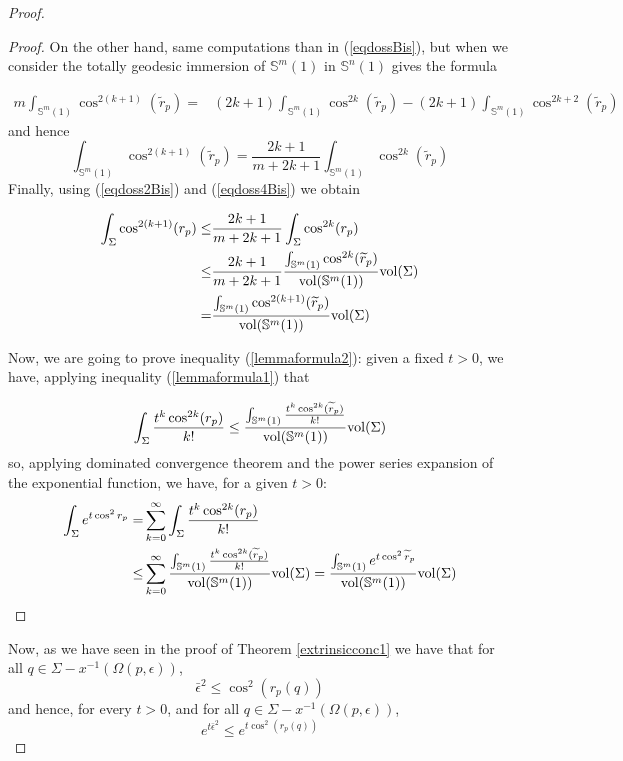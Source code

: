 \documentclass{amsart}
\theoremstyle{definition}
\theoremstyle{remark}
\newcommand{\ese}{\mathbb{S}}
\begin{document}
\begin{proof}
\begin{proof}
On the other hand, same computations than in (\ref{eqdossBis}), but when we consider the totally geodesic immersion of $\ese^m(1)$ in $\ese^n(1)$ gives the formula

$$
\begin{aligned}
m\int_{\ese^m(1)} \cos^{2(k+1)}(\widetilde{r}_p)=&(2k+1)\int_{\ese^m(1)}\cos^{2k}(\widetilde{r}_p)-(2k+1)\int_{\ese^m(1)} \cos^{2k+2}(\widetilde{r}_p)
\end{aligned}
$$
and hence
\begin{equation}\label{eqdoss4Bis}
\int_{\ese^m(1)} \cos^{2(k+1)}(\widetilde{r}_p)=\frac{2k+1}{m+2k+1}\int_{\ese^m(1)}\cos^{2k}(\widetilde{r}_p)
\end{equation}
Finally, using (\ref{eqdoss2Bis}) and (\ref{eqdoss4Bis}) we obtain

\begin{equation}\label{eqdoss5Bis}
\begin{aligned}
\int_\Sigma \cos^{2(k+1)}(r_p)\leq& \frac{2k+1}{m+2k+1}\int_\Sigma \cos^{2k}(r_p)\\  \leq & \frac{2k+1}{m+2k+1}\frac{\int_{\mathbb{S}^m(1)} \cos^{2k}(\widetilde{r}_p)}{{\rm vol}(\mathbb{S}^m(1))} {\rm vol}(\Sigma)\\
=&\frac{\int_{\mathbb{S}^m(1)} \cos^{2(k+1)}(\widetilde{r}_p)}{{\rm vol}(\mathbb{S}^m(1))} {\rm vol}(\Sigma)
\end{aligned}
\end{equation}

Now, we are going to prove inequality (\ref{lemmaformula2}): given a fixed $t>0$, we have, applying inequality (\ref{lemmaformula1}) that

$$\int_\Sigma\frac{t^k \cos^{2k}(r_p)}{k!} \leq \frac{\int_{\mathbb{S}^m(1)}\frac{t^k \cos^{2k}(\widetilde{r}_p)}{k!}}{{\rm vol}(\mathbb{S}^m(1))} {\rm vol}(\Sigma)$$
 so, applying dominated convergence theorem and the power series expansion of the exponential function, we have, for a given $t>0$:
$$
\begin{aligned}
\int_{\Sigma} e^{t \cos^2r_p} =&\sum_{k=0}^\infty \int_\Sigma\frac{t^k \cos^{2k}(r_p)}{k!} \\
\leq& 
\sum_{k=0}^\infty \frac{\int_{\mathbb{S}^m(1)}\frac{t^k \cos^{2k}(\widetilde{r}_p)}{k!}}{{\rm vol}(\mathbb{S}^m(1))} {\rm vol}(\Sigma)=\frac{\int_{\ese^m(1)} e^{t \cos^2\widetilde{r}_p}}{{\rm vol}(\mathbb{S}^m(1))} {\rm vol}(\Sigma)
\end{aligned}
$$
\end{proof}
Now, as we have seen in the proof of Theorem \ref{extrinsicconc1}
we have that for all  $q \in\Sigma-x^{-1}(\Omega(p,\epsilon))$, 
$$ \bar\epsilon^2 \leq \cos^2(r_p(q))$$
and hence, for every $t >0$, and for all $q \in \Sigma- x^{-1}(\Omega(p,\epsilon))$,
$$e^{t\bar\epsilon^2} \leq e^{t\cos^2(r_p(q))} $$


\end{proof}
\end{document}
